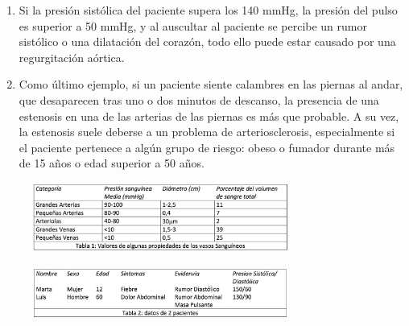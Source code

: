 \documentclass[10pt, a4paper,spanish]{article}
\begin{document}
\begin{enumerate}
			\item Si la presión sistólica del paciente supera los 140 mmHg, la presión del pulso es superior a 50 mmHg, y al auscultar al paciente se percibe un rumor sistólico o una dilatación del corazón, todo ello puede estar causado por una regurgitación aórtica.

			\item Como último ejemplo, si un paciente siente calambres en las piernas al andar, que desaparecen tras uno o dos minutos de descanso, la presencia de una estenosis en una de las arterias de las piernas es más que probable. A su vez, la estenosis suele deberse a un problema de arteriosclerosis, especialmente si el paciente pertenece a algún grupo de riesgo: obeso o fumador durante más de 15 años o edad superior a 50 años.

		\end{enumerate}

		\begin{figure}[H]
			\begin{center}
				\includegraphics[width=0.75\textwidth]{table-1}
			\end{center}
		\end{figure}

		\begin{figure}[H]
			\begin{center}
				\includegraphics[width=0.75\textwidth]{table-2}
			\end{center}
		\end{figure}
\end{document}

